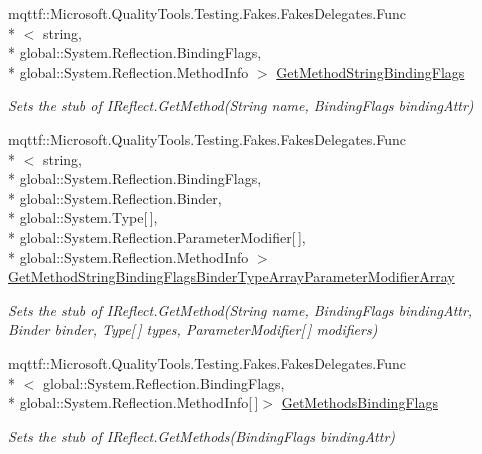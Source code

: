 \begin{DoxyCompactItemize}
mqttf\-::\-Microsoft.\-Quality\-Tools.\-Testing.\-Fakes.\-Fakes\-Delegates.\-Func\\*
$<$ string, \\*
global\-::\-System.\-Reflection.\-Binding\-Flags, \\*
global\-::\-System.\-Reflection.\-Method\-Info $>$ \hyperlink{class_system_1_1_runtime_1_1_interop_services_1_1_expando_1_1_fakes_1_1_stub_i_expando_aaf6ff2a02872b0b4cfc3da838551a942}{Get\-Method\-String\-Binding\-Flags}
\begin{DoxyCompactList}\small\item\em Sets the stub of I\-Reflect.\-Get\-Method(\-String name, Binding\-Flags binding\-Attr)\end{DoxyCompactList}\item 
mqttf\-::\-Microsoft.\-Quality\-Tools.\-Testing.\-Fakes.\-Fakes\-Delegates.\-Func\\*
$<$ string, \\*
global\-::\-System.\-Reflection.\-Binding\-Flags, \\*
global\-::\-System.\-Reflection.\-Binder, \\*
global\-::\-System.\-Type\mbox{[}$\,$\mbox{]}, \\*
global\-::\-System.\-Reflection.\-Parameter\-Modifier\mbox{[}$\,$\mbox{]}, \\*
global\-::\-System.\-Reflection.\-Method\-Info $>$ \hyperlink{class_system_1_1_runtime_1_1_interop_services_1_1_expando_1_1_fakes_1_1_stub_i_expando_a4eccb0dcb08ac242f275b65cdf50b5e5}{Get\-Method\-String\-Binding\-Flags\-Binder\-Type\-Array\-Parameter\-Modifier\-Array}
\begin{DoxyCompactList}\small\item\em Sets the stub of I\-Reflect.\-Get\-Method(\-String name, Binding\-Flags binding\-Attr, Binder binder, Type\mbox{[}$\,$\mbox{]} types, Parameter\-Modifier\mbox{[}$\,$\mbox{]} modifiers)\end{DoxyCompactList}\item 
mqttf\-::\-Microsoft.\-Quality\-Tools.\-Testing.\-Fakes.\-Fakes\-Delegates.\-Func\\*
$<$ global\-::\-System.\-Reflection.\-Binding\-Flags, \\*
global\-::\-System.\-Reflection.\-Method\-Info\mbox{[}$\,$\mbox{]}$>$ \hyperlink{class_system_1_1_runtime_1_1_interop_services_1_1_expando_1_1_fakes_1_1_stub_i_expando_abc0c9c10134b33bae0a9350f3be089ea}{Get\-Methods\-Binding\-Flags}
\begin{DoxyCompactList}\small\item\em Sets the stub of I\-Reflect.\-Get\-Methods(\-Binding\-Flags binding\-Attr)\end{DoxyCompactList}\item 

\end{DoxyCompactItemize}
